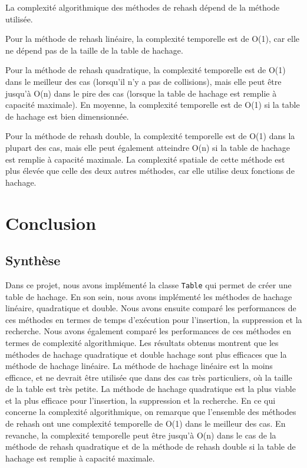 \documentclass{article}
\begin{document}
    La complexité algorithmique des méthodes de rehash dépend de la méthode utilisée.

    Pour la méthode de rehash linéaire, la complexité temporelle est de O(1), car elle ne dépend pas de la taille de la table de hachage.

    Pour la méthode de rehash quadratique, la complexité temporelle est de O(1) dans le meilleur des cas (lorsqu'il n'y a pas de collisions), mais elle peut être jusqu'à O(n) dans le pire des cas (lorsque la table de hachage est remplie à capacité maximale). En moyenne, la complexité temporelle est de O(1) si la table de hachage est bien dimensionnée.

    Pour la méthode de rehash double, la complexité temporelle est de O(1) dans la plupart des cas, mais elle peut également atteindre O(n) si la table de hachage est remplie à capacité maximale.
    La complexité spatiale de cette méthode est plus élevée que celle des deux autres méthodes, car elle utilise deux fonctions de hachage.

    \newpage
    \section{Conclusion}\label{sec:conclusion}

    \subsection{Synthèse}\label{subsec:synthese}

    Dans ce projet, nous avons implémenté la classe \texttt{Table} qui permet de créer une table de hachage.
    En son sein, nous avons implémenté les méthodes de hachage linéaire, quadratique et double.
    Nous avons ensuite comparé les performances de ces méthodes en termes de temps d'exécution pour l'insertion, la suppression et la recherche.
    Nous avons également comparé les performances de ces méthodes en termes de complexité algorithmique.
    Les résultats obtenus montrent que les méthodes de hachage quadratique et double hachage sont plus efficaces que la méthode de hachage linéaire.
    La méthode de hachage linéaire est la moins efficace, et ne devrait être utilisée que dans des cas très particuliers, où la taille de la table est très petite.
    La méthode de hachage quadratique est la plus viable et la plus efficace pour l'insertion, la suppression et la recherche.
    En ce qui concerne la complexité algorithmique, on remarque que l'ensemble des méthodes de rehash ont une complexité temporelle de O(1) dans le meilleur des cas.
    En revanche, la complexité temporelle peut être jusqu'à O(n) dans le cas de la méthode de rehash quadratique et de la méthode de rehash double si la table de hachage est remplie à capacité maximale.
\end{document}
